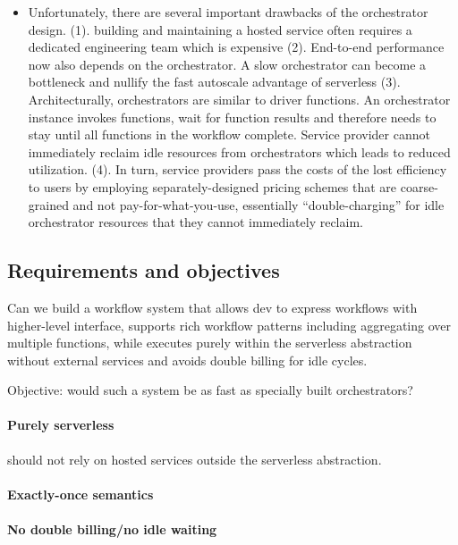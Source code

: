 \begin{itemize}
	\item Unfortunately, there are several important drawbacks of the
	orchestrator design. (1). building and maintaining a hosted service often
	requires a dedicated engineering team which is expensive (2). End-to-end
	performance now also depends on the orchestrator. A slow orchestrator can
	become a bottleneck and nullify the fast autoscale advantage of serverless
	(3). Architecturally, orchestrators are similar to driver functions. An
	orchestrator instance invokes functions, wait for function results and
	therefore needs to stay until all functions in the workflow complete.
	Service provider cannot immediately reclaim idle resources from
	orchestrators which leads to reduced utilization. (4). In turn, service
	providers pass the costs of the lost efficiency to users by employing
	separately-designed pricing schemes that are coarse-grained and not
	pay-for-what-you-use, essentially ``double-charging'' for idle
	orchestrator resources that they cannot immediately reclaim.

\end{itemize}


\subsection{Requirements and objectives}

Can we build a workflow system that allows dev to express workflows
with higher-level interface, supports rich workflow patterns including
aggregating over multiple functions, while executes purely within the
serverless abstraction without external services and avoids double billing
for idle cycles.

Objective: would such a system be as fast as specially built orchestrators?

\paragraph{Purely serverless} should not rely on hosted services outside the
serverless abstraction.

\paragraph{Exactly-once semantics}

\paragraph{No double billing/no idle waiting}

